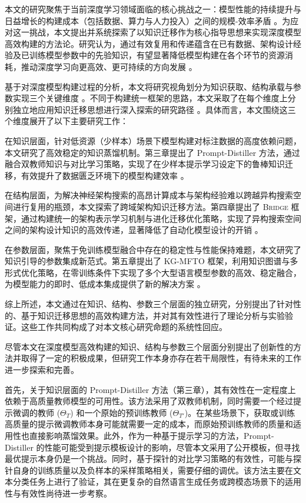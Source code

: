 \documentclass[../main.tex]{subfiles}
\begin{document}
\label{sec:ch6-summary-and-outlook}

\label{sec:ch6-1-overall-summary}

本文的研究聚焦于当前深度学习领域面临的核心挑战之一：模型性能的持续提升与日益增长的构建成本（包括数据、算力与人力投入）之间的规模-效率矛盾 。为应对这一挑战，本文提出并系统探索了以知识迁移作为核心指导思想来实现深度模型高效构建的方法论。研究认为，通过有效复用和传递蕴含在已有数据、架构设计经验及已训练模型参数中的先验知识，有望显著降低模型构建在各个环节的资源消耗，推动深度学习向更高效、更可持续的方向发展 。

基于对深度模型构建过程的分析，本文将研究视角划分为知识获取、结构承载与参数实现三个关键维度 。不同于构建统一框架的思路，本文采取了在每个维度上分别独立地应用知识迁移思想进行深入探索的研究路径 。具体而言，本文围绕这三个维度展开了以下主要研究工作：

在知识层面，针对低资源（少样本）场景下模型构建对标注数据的高度依赖问题，本文研究了高效稳定的知识蒸馏机制。第三章提出了 Prompt-Distiller 方法，通过融合双教师知识与对比学习策略，实现了在少样本提示学习设定下的鲁棒知识迁移，有效提升了数据匮乏环境下的模型构建效率 。

在结构层面，为解决神经架构搜索的高昂计算成本与架构经验难以跨越异构搜索空间进行复用的瓶颈，本文探索了跨域架构知识迁移方法。第四章提出了 \textsc{Bridge} 框架，通过构建统一的架构表示学习机制与进化迁移优化策略，实现了异构搜索空间之间的架构设计知识的高效传递，显著降低了自动化模型设计的开销 。

在参数层面，聚焦于免训练模型融合中存在的稳定性与性能保持难题，本文研究了知识引导的参数集成新范式。第五章提出了 KG-MFTO 框架，利用知识图谱与多形式优化策略，在零训练条件下实现了多个大型语言模型参数的高效、稳定融合，为模型能力的即时、低成本集成提供了新的解决方案 。

综上所述，本文通过在知识、结构、参数三个层面的独立研究，分别提出了针对性的、基于知识迁移思想的高效构建方法，并对其有效性进行了理论分析与实验验证。这些工作共同构成了对本文核心研究命题的系统性回应。

\label{sec:ch6-2-limitations-analysis}

尽管本文在深度模型高效构建的知识、结构与参数三个层面分别提出了创新性的方法并取得了一定的积极成果，但研究工作本身亦存在若干局限性，有待未来的工作进一步探索和完善。

首先，关于知识层面的 Prompt-Distiller 方法（第三章），其有效性在一定程度上依赖于高质量教师模型的可用性。该方法采用了双教师机制，同时需要一个经过提示微调的教师 ($\Theta_T$) 和一个原始的预训练教师 ($\Theta_{T'}$)。在某些场景下，获取或训练高质量的提示微调教师本身可能就需要一定的成本，而原始预训练教师的质量和适用性也直接影响蒸馏效果。此外，作为一种基于提示学习的方法，Prompt-Distiller 的性能可能受到提示模板设计的影响，尽管本文采用了公开模板，但寻找最优提示本身仍是一个挑战。同时，基于探针的对比学习策略的有效性，可能与探针自身的训练质量以及负样本的采样策略相关，需要仔细的调优。该方法主要在文本分类任务上进行了验证，其在更复杂的自然语言生成任务或跨模态场景下的适用性与有效性尚待进一步考察。
\end{document}
